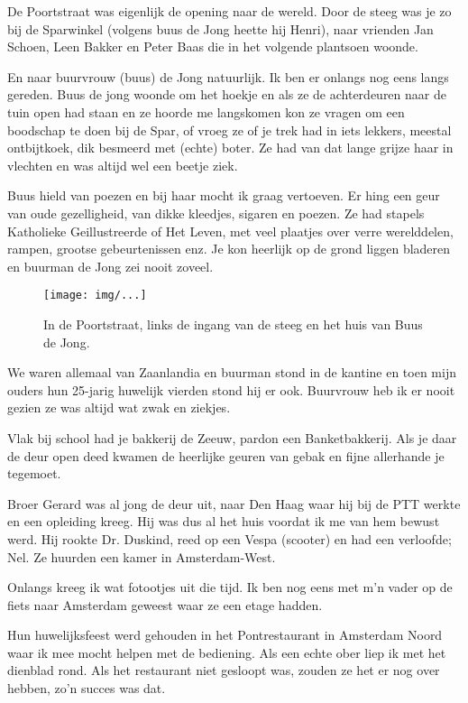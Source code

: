 \documentclass[10pt,twoside,openright]{memoir}
\begin{document}
De Poortstraat was eigenlijk de opening naar de wereld. Door de steeg was je zo bij de Sparwinkel (volgens buus de Jong heette hij Henri), naar vrienden Jan Schoen, Leen Bakker en Peter Baas die in het volgende plantsoen woonde. 

En naar buurvrouw (buus) de Jong natuurlijk. Ik ben er onlangs nog eens langs gereden. Buus de jong woonde om het hoekje en als ze de achterdeuren naar de tuin open had staan en ze hoorde me langskomen kon ze vragen om een boodschap te doen bij de Spar, of vroeg ze of je trek had in iets lekkers, meestal ontbijtkoek, dik besmeerd met (echte) boter. Ze had van dat lange grijze haar in vlechten en was altijd wel een beetje ziek.

Buus hield van poezen en bij haar mocht ik graag vertoeven. Er hing een geur van oude gezelligheid, van dikke kleedjes, sigaren en poezen. Ze had stapels Katholieke Geillustreerde of Het Leven, met veel plaatjes over verre werelddelen, rampen, grootse gebeurtenissen enz. Je kon heerlijk op de grond liggen bladeren en buurman de Jong zei nooit zoveel. 

\begin{figure}[t]
\texttt{[image: img/...]}
\caption{In de Poortstraat, links de ingang van de steeg en het huis van Buus de Jong.}
\end{figure}

We waren allemaal van Zaanlandia en buurman stond in de kantine en toen mijn ouders hun 25-jarig huwelijk vierden stond hij er ook. Buurvrouw heb ik er nooit gezien ze was altijd wat zwak en ziekjes. 

Vlak bij school had je bakkerij de Zeeuw, pardon een Banketbakkerij. Als je daar de deur open deed kwamen de heerlijke geuren van gebak en fijne allerhande je tegemoet.

Broer Gerard was al jong de deur uit, naar Den Haag waar hij bij de PTT werkte en een opleiding kreeg. Hij was dus al het huis voordat ik me van hem bewust werd. Hij rookte Dr. Duskind, reed op een Vespa (scooter) en had een verloofde; Nel. Ze huurden een kamer in Amsterdam-West.

Onlangs kreeg ik wat fotootjes uit die tijd. Ik ben nog eens met m’n vader op de fiets naar Amsterdam geweest waar ze een etage hadden. 

Hun huwelijksfeest werd gehouden in het Pontrestaurant in Amsterdam Noord waar ik mee mocht helpen met de bediening. Als een echte ober liep ik met het dienblad rond. Als het restaurant niet gesloopt was, zouden ze het er nog over hebben, zo’n succes was dat.
\end{document}

